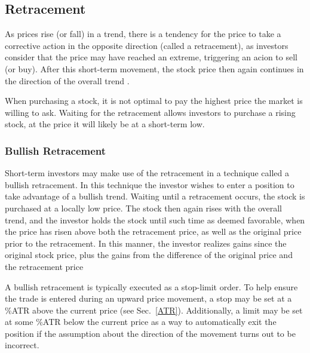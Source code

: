 \subsection{Retracement}
%
As prices rise (or fall) in a trend, there is a tendency for the price to take a corrective action in the opposite direction (called a retracement), as investors consider that the price may have reached an extreme, triggering an acion to sell (or buy).  After this short-term movement, the stock price then again continues in the direction of the overall trend \cite{Barbara}.  
\par
When purchasing a stock, it is not optimal to pay the highest price the market is willing to ask.  Waiting for the retracement allows investors to purchase a rising stock, at the price it will likely be at a short-term low.
%
\subsubsection{Bullish Retracement}
\label{bullishRetracement}
%
Short-term investors may make use of the retracement in a technique called a bullish retracement.  In this technique the investor wishes to enter a position to take advantage of a bullish trend.  Waiting until a retracement occurs, the stock is purchased at a locally low price.  The stock then again rises with the overall trend, and the investor holds the stock until such time as deemed favorable, when the price has risen above both the retracement price, as well as the original price prior to the retracement.   In this manner, the investor realizes gains since the original stock price, plus the gains from the difference of the original price and the retracement price \cite{Wealth}
\par
A bullish retracement is typically executed as a stop-limit order.  To help ensure the trade is entered during an upward price movement, a stop may be set at a \%ATR above the current price (see Sec.~\ref{ATR}).  Additionally, a limit may be set at some \%ATR below the current price as a way to automatically exit the position if the assumption about the direction of the movement turns out to be incorrect.

%

